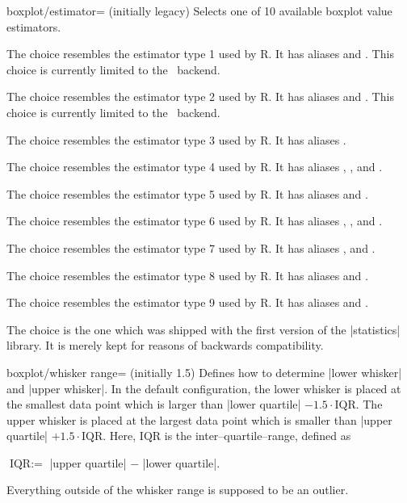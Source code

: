 \begin{pgfplotskey}{boxplot/estimator= (initially legacy)}
	Selects one of 10 available boxplot value estimators.

	The choice  resembles the estimator type 1 used by R. It has aliases  and . This choice is currently limited to the \lua\ backend.

	The choice  resembles the estimator type 2 used by R. It has aliases  and . This choice is currently limited to the \lua\ backend.

	The choice  resembles the estimator type 3 used by R. It has aliases .

	The choice  resembles the estimator type 4 used by R. It has aliases , , and .

	The choice  resembles the estimator type 5 used by R. It has aliases  and .

	The choice  resembles the estimator type 6 used by R. It has aliases , , and .

	The choice  resembles the estimator type 7 used by R. It has aliases ,  and .

	The choice  resembles the estimator type 8 used by R. It has aliases  and .

	The choice  resembles the estimator type 9 used by R. It has aliases  and .

	The choice  is the one which was shipped with the first version of the |statistics| library. It is merely kept for reasons of backwards compatibility. 
\end{pgfplotskey}

\begin{pgfplotskey}{boxplot/whisker range= (initially 1.5)}
	Defines how to determine |lower whisker| and |upper whisker|. In the default configuration, the lower whisker is placed at the smallest data point which is larger than |lower quartile| $- 1.5 \cdot \text{IQR}$. The upper whisker is placed at the largest data point which is smaller than |upper quartile| $+ 1.5 \cdot \text{IQR}$. Here, $\text{IQR}$ is the inter--quartile--range, defined as

	$\text{IQR} := $ |upper quartile| $-$ |lower quartile|.

	Everything outside of the whisker range is supposed to be an outlier.
\end{pgfplotskey}
\endgroup

